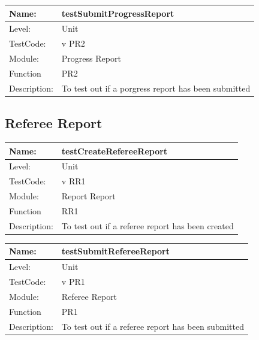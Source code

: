 \documentclass[12pt]{article}
\begin{document}
\begin{center}
\begin{tabular}{|l|p{12cm}|}
\hline

 Name: & testSubmitProgressReport \\
\hline
Level: & Unit \\
\hline
TestCode: & v PR2 \\
\hline
Module:& Progress Report\\
\hline
Function & PR2 \\
\hline
Description: & To test out if a porgress report has been submitted \\
\hline

\end{tabular}
\end{center}

\subsection{Referee Report}
\begin{center}
\begin{tabular}{|l|p{12cm}|}
\hline

 Name: & testCreateRefereeReport \\
\hline
Level: & Unit \\
\hline
TestCode: & v RR1 \\
\hline
Module:& Report Report\\
\hline
Function & RR1 \\
\hline
Description: & To test out if a referee report has been created \\
\hline

\end{tabular}
\end{center}

\begin{center}
\begin{tabular}{|l|p{12cm}|}
\hline

 Name: & testSubmitRefereeReport \\
\hline
Level: & Unit \\
\hline
TestCode: & v PR1 \\
\hline
Module:& Referee Report\\
\hline
Function & PR1 \\
\hline
Description: & To test out if a referee report has been submitted \\
\hline

\end{tabular}
\end{center}
\end{document}
